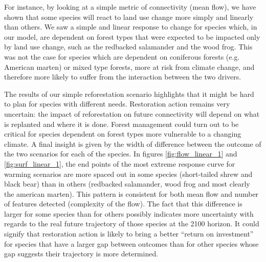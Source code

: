 For instance, by looking at a simple metric of connectivity (mean flow), we have shown that some species will react to land use change more simply and linearly than others. We saw a simple and linear response to change for species which, in our model, are dependent on forest types that were expected to be impacted only by land use change, such as the redbacked salamander and the wood frog. This was not the case for species which are dependent on coniferous forests (e.g. American marten) or mixed type forests, more at risk from climate change, and therefore more likely to suffer from the interaction between the two drivers. 

The results of our simple reforestation scenario highlights that it might be hard to plan for species with different needs. Restoration action remains very uncertain: the impact of reforestation on future connectivity will depend on what is replanted and where it is done. Forest management could turn out to be critical for species dependent on forest types more vulnerable to a changing climate. A final insight is given by the width of difference between the outcome of the two scenarios for each of the species. In figures \ref{fig:flow_linear_1} and \ref{fig:surf_linear_1},  the end points of the most extreme response curve for warming scenarios are more spaced out in some species (short-tailed shrew and black bear) than in others (redbacked salamander, wood frog and most clearly the american marten). This pattern is consistent for both mean flow and number of features detected (complexity of the flow). The fact that this difference is larger for some species  than for others possibly indicates more uncertainty with regards to the real future trajectory of those species at the 2100 horizon. It could signify that restoration action is likely to bring a better “return on investment” for species that have a larger gap between outcomes than for other species whose gap suggests their trajectory is more determined.   

